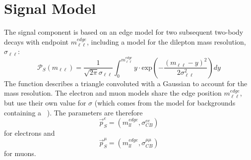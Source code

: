 
\section*{Signal Model}
\noindent\justify
The signal component is based on an edge model for two subsequent two-body decays with endpoint $m_{\ell\ell}^{edge}$, including a model for the dilepton mass resolution, $\sigma_{\ell\ell}$: 
\begin{equation*}
 {\mathcal{P}}_{S}(m_{\ell\ell}) = \frac{1}{\sqrt{2\pi}\sigma_{\ell\ell}} \int_{0}^{m_{\ell\ell}^{edge}} y \cdot \textrm{exp}\left( -\frac{(m_{\ell\ell}-y)^2}{2\sigma_{\ell\ell}^{2}}\right) dy
\end{equation*}
The function describes a triangle convoluted with a Gaussian to account for the mass resolution.
The electron and muon models share the edge position $m_{\ell\ell}^{edge}$, but use their own value for $\sigma$ 
(which comes from the model for backgrounds containing a \PZ\ ). The parameters are therefore
\begin{equation*}
\vec{p}_{S}^{e} = (m_{ll}^{edge},\sigma_{CB}^{ee})
\end{equation*}
for electrons and 
\begin{equation*}
\vec{p}_{S}^{\mu} = (m_{ll}^{edge},\sigma_{CB}^{\mu\mu})
\end{equation*}
for muons.
                                                                                                                                                                                                                                                                                                                                                                                                                                           
